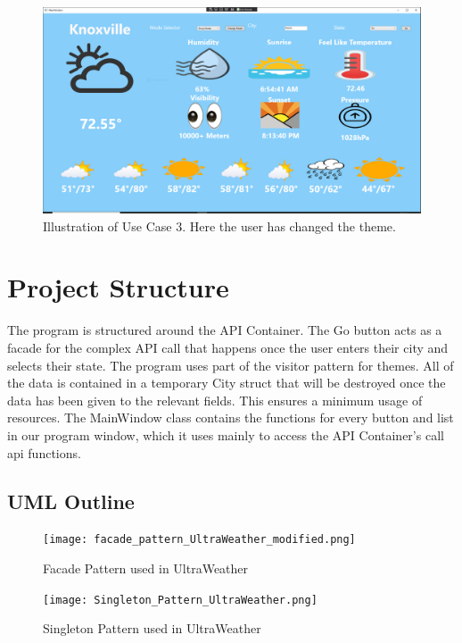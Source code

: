 \documentclass[10pt,conference,onecolumn,compsoc]{IEEEtran}
\begin{document}
\begin{figure}[H]
\includegraphics[scale=0.3]{use_case_3.png}
\caption{Illustration of Use Case 3. Here the user has changed the theme.}
\label{use_case_3}
\end{figure}


\pagebreak
\section{Project Structure}
The program is structured around the API Container. The Go button acts as a facade for the complex API call that happens once the user enters their city and selects their state. The program uses part of the visitor pattern for themes. All of the data is contained in a temporary City struct that will be destroyed once the data has been given to the relevant fields. This ensures a minimum usage of resources.
The MainWindow class contains the functions for every button and list in our program window, which it uses mainly to access the API Container's call api functions.

\subsection{UML Outline}
\begin{figure}[H]
\texttt{[image: facade\_pattern\_UltraWeather\_modified.png]}
\caption{Facade Pattern used in UltraWeather}
\label{fig:Facade Pattern}
\end{figure}

\begin{figure}[H]
\texttt{[image: Singleton\_Pattern\_UltraWeather.png]}
\caption{Singleton Pattern used in UltraWeather}
\label{fig:Singleton Pattern}
\end{figure}
\end{document}
